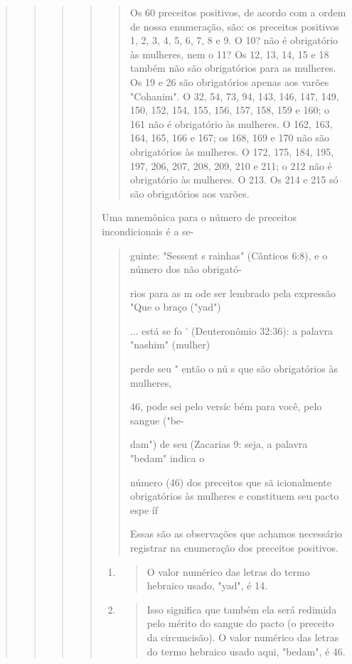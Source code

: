 \begin{quote}
\begin{quote}
\begin{quote}
\begin{quote}
\begin{quote}
Os 60 preceitos positivos, de acordo com a ordem de nossa enume­ração,
são: os preceitos positivos 1, 2, 3, 4, 5, 6, 7, 8 e 9. O 10? não é
obrigató­rio às mulheres, nem o 11? Os 12, 13, 14, 15 e 18 também não
são obrigatórios para as mulheres. Os 19 e 26 são obrigatórios apenas
aos varões "Cohanim". O 32, 54, 73, 94, 143, 146, 147, 149, 150, 152,
154, 155, 156, 157, 158, 159 e 160; o 161 não é obrigatório às mulheres.
O 162, 163, 164, 165, 166 e 167; os 168, 169 e 170 não são obrigatórios
às mulheres. O 172, 175, 184, 195, 197, 206, 207, 208, 209, 210 e 211; o
212 não é obrigatório às mulheres. O 213. Os 214 e 215 só são
obrigatórios aos varões.
\end{quote}

Uma mnemônica para o número de preceitos incondicionais é a se-

\begin{quote}
guinte: "Sessent s rainhas" (Cânticos 6:8), e o número dos não obrigató-

rios para as m ode ser lembrado pela expressão "Que o braço ("yad")

... está se fo ' (Deuteronômio 32:36): a palavra "nashim" (mulher)

perde seu " então o nú s que são obrigatórios às mulheres,

46, pode sei pelo versíc bém para você, pelo sangue ("be-

dam") de seu (Zacarias 9: seja, a palavra "bedam" indica o

número (46) dos preceitos que sã icionalmente obrigatórios às mulheres
e constituem seu pacto espe íf

Essas são as observações que achamos necessário registrar na enu­meração
dos preceitos positivos.
\end{quote}

\begin{enumerate}
\def\labelenumi{\arabic{enumi}.}
\setcounter{enumi}{230}
\item
 \begin{quote}
 O valor numérico das letras do termo hebraico usado, "yad", é 14.
 \end{quote}
\item
 \begin{quote}
 Isso significa que também ela será redimida pelo mérito do sangue do
 pacto (o preceito da circuncisão). O valor numérico das letras do
 termo hebraico usado aqui, "bedam", é 46.
 \end{quote}
\end{enumerate}



\end{quote}
\end{quote}
\end{quote}
\end{quote}
